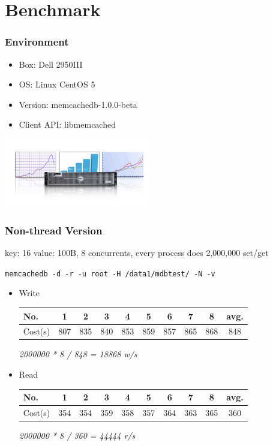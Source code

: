 \documentclass{beamer}
\newcommand{\mysection}[1]{\section{#1}\frame{\frametitle{#1}\tableofcontents[sectionstyle=show/shaded,subsectionstyle=show/shaded/shaded]}}
\begin{document}
\mysection{Benchmark}
\begin{frame}
\frametitle{Environment}
\begin{itemize}
\item Box: Dell 2950III
\item OS: Linux CentOS 5
\item Version: memcachedb-1.0.0-beta
\item Client API: libmemcached
\end{itemize}
\includegraphics[height=3cm]{dell2950}
\end{frame}

\begin{frame}
\frametitle{Non-thread Version}
key: 16 value: 100B, 8 concurrents, every process does 2,000,000 set/get
\begin{block}{}
\texttt{memcachedb -d -r -u root -H /data1/mdbtest/ -N -v}
\end{block}
\begin{itemize}
\item Write
\begin{tabular}{l|c|c|c|c|c|c|c|c|c} \hline
No.      & 1   & 2   & 3   & 4   & 5   & 6   & 7   & 8   &  avg.\\ \hline
Cost(s)  & 807 & 835 & 840 & 853 & 859 & 857 & 865 & 868 &  848 \\ \hline
\end{tabular}
\begin{center}\textit{2000000 * 8 / 848 = 18868 w/s}\end{center}
\item Read
\begin{tabular}{l|c|c|c|c|c|c|c|c|c} \hline
No.      & 1   & 2   & 3   & 4   & 5   & 6   & 7   & 8   &  avg.\\ \hline
Cost(s)  & 354 & 354 & 359 & 358 & 357 & 364 & 363 & 365 &  360 \\ \hline
\end{tabular}
\begin{center}\textit{2000000 * 8 / 360 = 44444 r/s}\end{center}
\end{itemize}
\end{frame}
\end{document}
